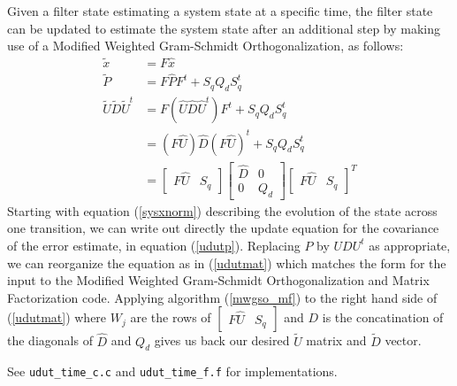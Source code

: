 Given a filter state estimating a system state at a specific time, the
filter state can be updated to estimate the system state after an
additional step by making use of a Modified Weighted Gram-Schmidt
Orthogonalization, as follows:
\begin{subequations}
\begin{align}
  {\tilde x} & = F {\hat x}
\label{udutx}
\\
  {\tilde P} & = F {\hat P} F^t + S_q Q_d S_q^t
\label{udutp}
\\
 {\tilde U} {\tilde D} {\tilde U}^t
 & =
  F ( {\hat U} {\hat D} {\hat U}^t ) F^t + S_q Q_d S_q^t
\nonumber
\\
 & =
  ( F {\hat U} ) {\hat D}
  ( F {\hat U} ) ^t
  + S_q Q_d S_q^t
\nonumber
\\
 & =
 \begin{bmatrix} F {\hat U} & S_q \end{bmatrix}
 \begin{bmatrix} {\hat D} & 0 \\ 0 & Q_d \end{bmatrix}
 \begin{bmatrix} F {\hat U} & S_q \end{bmatrix}^T
\label{udutmat}
\end{align}
\end{subequations}
Starting with equation (\ref{sysxnorm})
describing the evolution of the state
across one transition,
we can write out directly the update
equation for the covariance of the
error estimate, in equation (\ref{udutp}).
Replacing $P$ by $UDU^t$ as appropriate,
we can reorganize the equation as in (\ref{udutmat})
which matches the form for the input to the
Modified Weighted Gram-Schmidt Orthogonalization
and Matrix Factorization code.
Applying algorithm (\ref{mwgso_mf})
to the right hand side of (\ref{udutmat})
where $W_j$ are the rows of $ \begin{bmatrix} F {\hat U} & S_q \end{bmatrix}$
and $D$ is the concatination of the diagonals of ${\hat D}$ and $Q_d$
gives us back our desired ${\tilde U}$ matrix
and ${\tilde D}$ vector.

See \verb|udut_time_c.c| and \verb|udut_time_f.f|
for implementations.

